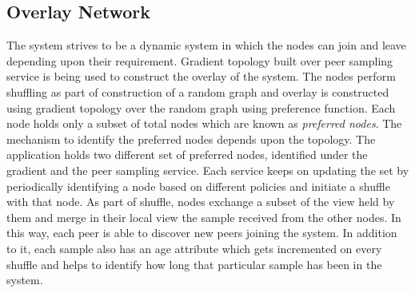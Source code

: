 \documentclass[a4paper,11pt]{kth-mag}
\begin{document}
\subsection*{Overlay Network}

The system strives to be a dynamic system in which the nodes can join and leave depending upon their requirement. Gradient topology built over peer sampling service is being used to construct the overlay of the system. The nodes perform shuffling as part of construction of a random graph and overlay is constructed using gradient topology over the random graph using preference function. Each node holds only a subset of total nodes which are known as \textit{preferred nodes}. The mechanism to identify the preferred nodes depends upon the topology. The application holds two different set of preferred nodes, identified under the gradient and the peer sampling service. Each service keeps on updating the set by periodically identifying a node based on different policies and initiate a shuffle with that node. As part of shuffle, nodes exchange a subset of the view held by them and merge in their local view the sample received from the other nodes. In this way, each peer is able to discover new peers joining the system. In addition to it, each sample also has an age attribute which gets incremented on every shuffle and helps to identify how long that particular sample has been in the system.
\end{document}
